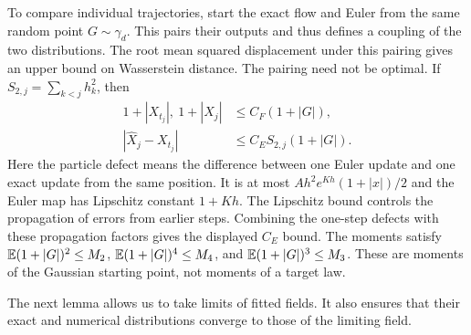 To compare individual trajectories, start the exact flow and Euler from the
same random point $G\sim\gamma_d$. This pairs their outputs and thus defines
a coupling of the two distributions. The root mean squared displacement
under this pairing gives an upper bound on Wasserstein distance. The
pairing need not be optimal. If
$S_{2,j}=\sum_{k<j}h_k^2$, then
\begin{align}
 1+|X_{t_j}|,\ 1+|\widehat X_j|&\le C_F(1+|G|),\\
 |\widehat X_j-X_{t_j}|&\le C_E S_{2,j}(1+|G|).
 \label{eq:strong}
\end{align}
Here the particle defect means the difference between one Euler update and
one exact update from the same position. It is at most
$Ah^2e^{Kh}(1+|x|)/2$ and the Euler map has Lipschitz constant $1+Kh$.
The Lipschitz bound controls the propagation of errors from earlier steps.
Combining the one-step defects with these propagation factors gives the
displayed $C_E$ bound.
The moments satisfy $\mathbb E(1+|G|)^2\le M_2$,
$\mathbb E(1+|G|)^4\le M_4$, and $\mathbb E(1+|G|)^3\le M_3$.
These are moments of the Gaussian starting point, not moments of a target law.

The next lemma allows us to take limits of fitted fields. It also ensures
that their exact and numerical distributions converge to those of the
limiting field.

